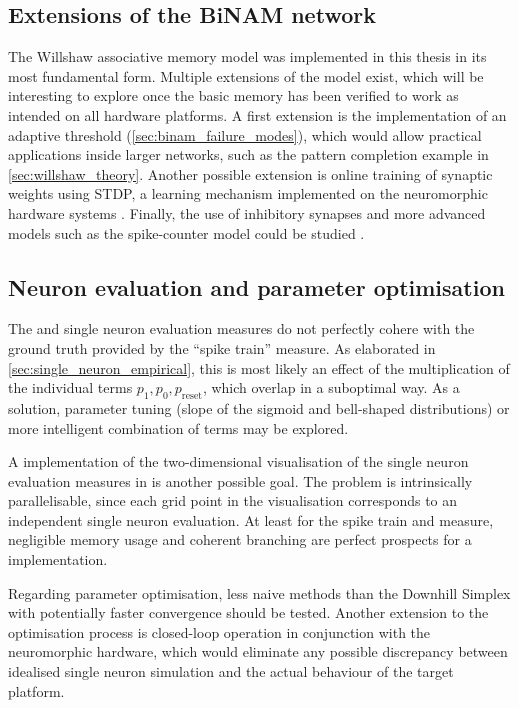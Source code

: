 \subsection{Extensions of the BiNAM network}

The Willshaw associative memory model was implemented in this thesis in its most fundamental form. Multiple extensions of the model exist, which will be interesting to explore once the basic memory has been verified to work as intended on all hardware platforms. A first extension is the implementation of an adaptive threshold (\cref{sec:binam_failure_modes}), which would allow practical applications inside larger networks, such as the pattern completion example in \cref{sec:willshaw_theory}. Another possible extension is online training of synaptic weights using \gls{STDP}, a learning mechanism implemented on the \HBP neuromorphic hardware systems \cite{sjostrom2010spike}. Finally, the use of inhibitory synapses and more advanced models such as the spike-counter model could be studied \cite{knoblauch2003synchronization,knoblauch2014structural,muller2015programmierung}.

\subsection{Neuron evaluation and parameter optimisation}

The \SGSO and \SGMO single neuron evaluation measures do not perfectly cohere with the ground truth provided by the \enquote{spike train} measure. As elaborated in \cref{sec:single_neuron_empirical}, this is most likely an effect of the multiplication of the individual terms $p_1, p_0, p_\mathrm{reset}$, which overlap in a suboptimal way. As a solution, parameter tuning (slope of the sigmoid and bell-shaped distributions) or more intelligent combination of terms may be explored.

A \GPU implementation of the two-dimensional visualisation of the single neuron evaluation measures in \AdExpSim is another possible goal. The problem is intrinsically parallelisable, since each grid point in the visualisation corresponds to an independent single neuron evaluation. At least for the spike train and \SGSO measure, negligible memory usage and coherent branching are perfect prospects for a \GPU implementation.

Regarding parameter optimisation, less naive methods than the Downhill Simplex with potentially faster convergence should be tested. Another extension to the optimisation process is closed-loop operation in conjunction with the neuromorphic hardware, which would eliminate any possible discrepancy between idealised single neuron simulation and the actual behaviour of the target platform.

